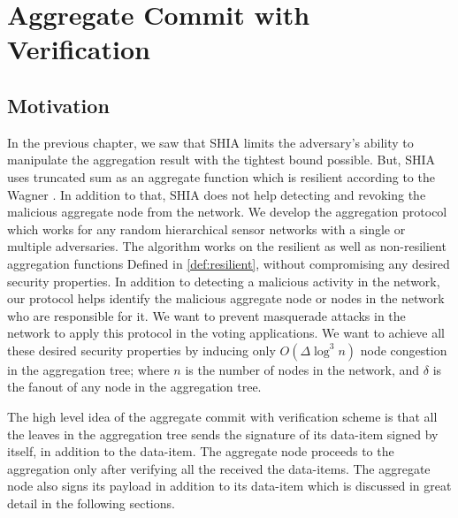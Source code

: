 \chapter{Aggregate Commit with Verification} %
\label{cha:A Protocol for Commitment Tree Generation}
\section{Motivation}	
	In the previous chapter, we saw that SHIA limits the adversary's ability to manipulate the aggregation result with the tightest bound possible.
	But, SHIA uses truncated sum as an aggregate function which is resilient according to the Wagner \cite{wagner2004resilient}.
	In addition to that, SHIA does not help detecting and revoking the malicious aggregate node from the network.
	We develop the aggregation protocol which works for any random hierarchical sensor networks with a single or multiple adversaries.
	The algorithm works on the resilient as well as non-resilient aggregation functions Defined in \ref{def:resilient}, without compromising any desired security properties.
	In addition to detecting a malicious activity in the network, our protocol helps identify the malicious aggregate node or nodes in the network who are responsible for it.
	We want to prevent masquerade attacks in the network to apply this protocol in the voting applications.
	We want to achieve all these desired security properties by inducing only $O(\Delta \log^{3} n)$ node congestion in the aggregation tree; where $n$ is the number of nodes in the network, and $\delta$ is the fanout of any node in the aggregation tree.
	
	The high level idea of the aggregate commit with verification scheme is that all the leaves in the aggregation tree sends the signature of its data-item signed by itself, in addition to the data-item.
	The aggregate node proceeds to the aggregation only after verifying all the received the data-items.
	The aggregate node also signs its payload in addition to its data-item which is discussed in great detail in the following sections.

